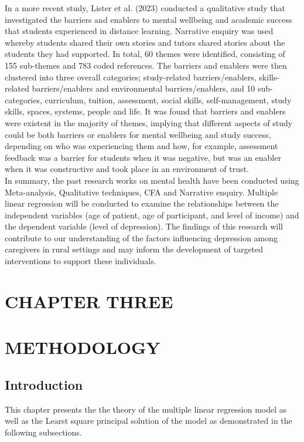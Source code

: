 \documentclass[12pt]{article}
\numberwithin{equation}{section}
\begin{document}
	\noindent In a more recent study, Lister et al. (2023) conducted a qualitative study that investigated the barriers and enablers to mental wellbeing and academic success that students experienced in distance learning. Narrative enquiry was used whereby students shared their own stories and tutors shared stories about the students they had supported. In total, 60 themes were identified, consisting of 155 sub-themes and 783 coded references. The barriers and enablers were then clustered into three overall categories; study-related barriers/enablers, skills-related barriers/enablers and environmental barriers/enablers, and 10 sub-categories, curriculum, tuition, assessment, social skills, self-management, study skills, spaces, systems, people and life. It was found that barriers and enablers were existent in the majority of themes, implying that different aspects of study could be both barriers or enablers for mental wellbeing and study success, depending on who was experiencing them and how, for example, assessment feedback was a barrier for students when it was negative, but was an enabler when it was constructive and took place in an environment of trust.\\
	
	\noindent In summary, the past research works on mental health have been conducted using Meta-analysis, Qualitative techniques, CFA and Narrative enquiry. Multiple linear regression will be conducted to examine the relationships between the independent variables
	(age of patient, age of participant, and level of income) and the dependent
	variable (level of depression). The findings of this research will contribute to
	our understanding of the factors influencing depression among caregivers in rural
	settings and may inform the development of targeted interventions to support
	these individuals. 
\newpage
\section*{CHAPTER THREE}
\section*{METHODOLOGY}
\label{sec:methodology}
\setcounter{section}{3}
\setcounter{subsection}{0}

\subsection{Introduction}
This chapter presents the the theory of the multiple linear regression model as well as the Learst square principal solution of the model as demonstrated in the following subsections.
\end{document}
